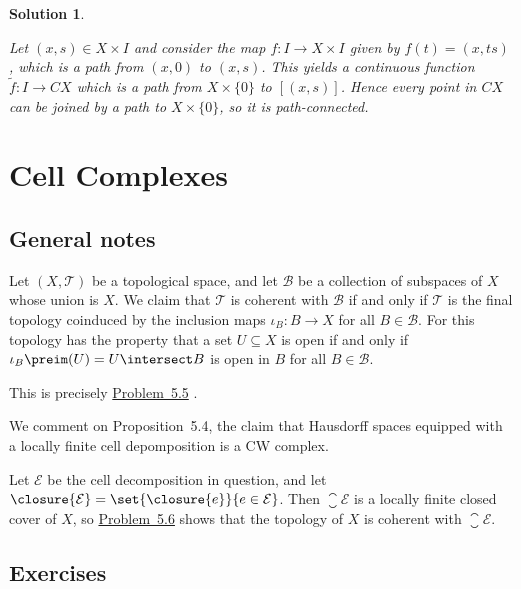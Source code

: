 \documentclass[article, a4paper, 11pt, oneside]{memoir}
\numberwithin{equation}{chapter}
\newcommand{\RNum}[1]{\uppercase\expandafter{\romannumeral #1\relax}}
\newcommand{\probref}[1]{%
    \hyperref[prob:#1]{Problem~#1}%
}
\theoremstyle{nonumberplain}
\newtheorem{solution}{Solution}
\newcommand{\calB}{\mathcal{B}}
\newcommand{\calE}{\mathcal{E}}
\newcommand{\calT}{\mathcal{T}}
\begin{document}
\begin{solution}
\begin{solutionsec}
    \item Let $(x,s) \in X \times I$ and consider the map $f \colon I \to X \times I$ given by $f(t) = (x, ts)$, which is a path from $(x,0)$ to $(x,s)$. This yields a continuous function $\tilde{f} \colon I \to CX$ which is a path from $X \times \{0\}$ to $[(x,s)]$. Hence every point in $CX$ can be joined by a path to $X \times \{0\}$, so it is path-connected.
\end{solutionsec}
\end{solution}


\chapter{Cell Complexes}

\section*{General notes}

\begin{remarkbreak}
    \label{rem:coherent-topologies}
    Let $(X,\calT)$ be a topological space, and let $\calB$ be a collection of subspaces of $X$ whose union is $X$. We claim that $\calT$ is coherent with $\calB$ if and only if $\calT$ is the final topology coinduced by the inclusion maps $\iota_B \colon B \to X$ for all $B \in \calB$. For this topology has the property that a set $U \subseteq X$ is open if and only if $\iota_B\preim(U) = U \intersect B$ is open in $B$ for all $B \in \calB$.

    This is precisely \probref{5.5}.
\end{remarkbreak}


\begin{remark}
    We comment on Proposition~5.4, the claim that Hausdorff spaces equipped with a locally finite cell depomposition is a CW complex.

    Let $\calE$ be the cell decomposition in question, and let $\closure{\calE} = \set{\closure{e}}{e \in \calE}$. Then $\closure{\calE}$ is a locally finite closed cover of $X$, so \probref{5.6} shows that the topology of $X$ is coherent with $\closure{\calE}$. %
\end{remark}


\section*{Exercises}
\end{document}
